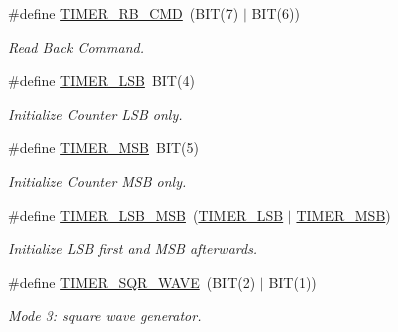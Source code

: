 \begin{DoxyCompactItemize}
\mbox{\label{group__i8254_ga4c2eecbfb96744a9c2af71dba75ecb18}} 
\#define \hyperlink{group__i8254_ga4c2eecbfb96744a9c2af71dba75ecb18}{T\+I\+M\+E\+R\+\_\+\+R\+B\+\_\+\+C\+MD}~(B\+IT(7) $\vert$ B\+IT(6))
\begin{DoxyCompactList}\small\item\em Read Back Command. \end{DoxyCompactList}\item 
\mbox{\label{group__i8254_gac18cb814ebd0d67235392c330e0e3504}} 
\#define \hyperlink{group__i8254_gac18cb814ebd0d67235392c330e0e3504}{T\+I\+M\+E\+R\+\_\+\+L\+SB}~B\+IT(4)
\begin{DoxyCompactList}\small\item\em Initialize Counter L\+SB only. \end{DoxyCompactList}\item 
\mbox{\label{group__i8254_ga2a8a6d363c612d756cd8d78480f7cd04}} 
\#define \hyperlink{group__i8254_ga2a8a6d363c612d756cd8d78480f7cd04}{T\+I\+M\+E\+R\+\_\+\+M\+SB}~B\+IT(5)
\begin{DoxyCompactList}\small\item\em Initialize Counter M\+SB only. \end{DoxyCompactList}\item 
\mbox{\label{group__i8254_ga8c0f1933323274c765e23837e4fbc8c7}} 
\#define \hyperlink{group__i8254_ga8c0f1933323274c765e23837e4fbc8c7}{T\+I\+M\+E\+R\+\_\+\+L\+S\+B\+\_\+\+M\+SB}~(\hyperlink{group__i8254_gac18cb814ebd0d67235392c330e0e3504}{T\+I\+M\+E\+R\+\_\+\+L\+SB} $\vert$ \hyperlink{group__i8254_ga2a8a6d363c612d756cd8d78480f7cd04}{T\+I\+M\+E\+R\+\_\+\+M\+SB})
\begin{DoxyCompactList}\small\item\em Initialize L\+SB first and M\+SB afterwards. \end{DoxyCompactList}\item 
\mbox{\label{group__i8254_ga4745cbf21da3d3fea5dbb080b2b73bac}} 
\#define \hyperlink{group__i8254_ga4745cbf21da3d3fea5dbb080b2b73bac}{T\+I\+M\+E\+R\+\_\+\+S\+Q\+R\+\_\+\+W\+A\+VE}~(B\+IT(2) $\vert$ B\+IT(1))
\begin{DoxyCompactList}\small\item\em Mode 3\+: square wave generator. \end{DoxyCompactList}\item 

\end{DoxyCompactItemize}
